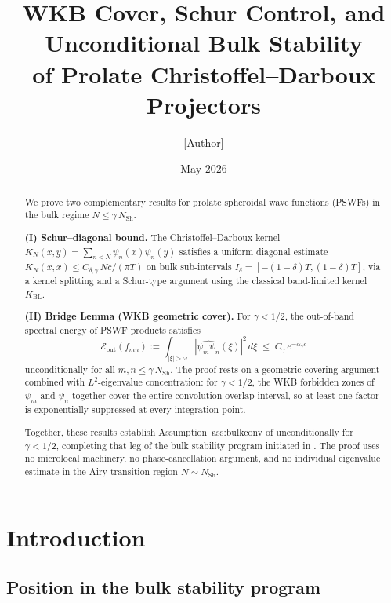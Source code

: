 \documentclass[12pt,a4paper]{article}
\title{%
  WKB Cover, Schur Control, and Unconditional Bulk Stability\\
  of Prolate Christoffel--Darboux Projectors%
}
\author{[Author]}
\date{May 2026}
\theoremstyle{definition}
\newcommand{\Eout}{\mathcal{E}_{\mathrm{out}}}
\begin{document}
\maketitle

\begin{abstract}
We prove two complementary results for prolate spheroidal wave
functions (PSWFs) in the bulk regime $N \le \gamma\,N_{\mathrm{Sh}}$.

\textbf{(I) Schur--diagonal bound.}
The Christoffel--Darboux kernel
$K_N(x,y) = \sum_{n<N}\psi_n(x)\psi_n(y)$
satisfies a uniform diagonal estimate
$K_N(x,x) \le C_{\delta,\gamma}\,Nc/(\pi T)$
on bulk sub-intervals $I_\delta = [-(1-\delta)T,(1-\delta)T]$,
via a kernel splitting and a Schur-type argument using
the classical band-limited kernel $K_{\mathrm{BL}}$.

\textbf{(II) Bridge Lemma (WKB geometric cover).}
For $\gamma < 1/2$, the out-of-band spectral energy of
PSWF products satisfies
\[
  \Eout(f_{mn})
  := \int_{|\xi|>\omega}|\widehat{\psi_m\psi_n}(\xi)|^2\,d\xi
  \;\le\; C_{\gamma}\,e^{-\alpha_\gamma c}
\]
unconditionally for all $m,n \le \gamma\,N_{\mathrm{Sh}}$.
The proof rests on a geometric covering argument
combined with $L^2$-eigenvalue concentration:
for $\gamma < 1/2$, the WKB forbidden zones of $\psi_m$
and $\psi_n$ together cover the entire convolution overlap
interval, so at least one factor is exponentially suppressed
at every integration point.

Together, these results establish
Assumption~\textup{ass:bulkconv} of \cite{PaperIII}
unconditionally for $\gamma < 1/2$, completing that leg
of the bulk stability program initiated in
\cite{PaperI,PaperII,PaperIII,PaperIV}.
The proof uses no microlocal machinery, no
phase-cancellation argument, and no individual eigenvalue
estimate in the Airy transition region
$N \sim N_{\mathrm{Sh}}$.
\end{abstract}

\tableofcontents

\section{Introduction}
\label{sec:intro}

\subsection{Position in the bulk stability program}
\end{document}
